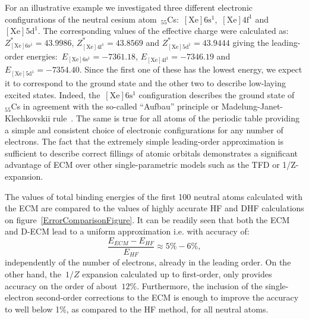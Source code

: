 For an illustrative example we investigated three different electronic configurations of the neutral cesium atom~$_{55}$Cs:~$[\mathrm{Xe}]6\mathrm{s}^{1}$,~$[\mathrm{Xe}]4\mathrm{f}^{1}$ and
$[\mathrm{Xe}]5\mathrm{d}^{1}$. The corresponding values of the effective charge were calculated as: $Z^*_{[\mathrm{Xe}]6\mathrm{s}^{1}} = 43.9986$, $Z^*_{[\mathrm{Xe}]4\mathrm{f}^{1}} = 43.8569$ and $Z^*_{[\mathrm{Xe}]5\mathrm{d}^{1}} = 43.9444$ giving the leading-order energies:~$E_{[\mathrm{Xe}]6\mathrm{s}^{1}} = -7361.18$, $E_{[\mathrm{Xe}]4\mathrm{f}^{1}} = -7346.19$ and $E_{[\mathrm{Xe}]5\mathrm{d}^{1}} = -7354.40$. Since the first one of these has the lowest energy, we expect it to correspond to the ground state and the other two to describe low-laying excited states. Indeed, the~$[\mathrm{Xe}]6\mathrm{s}^{1}$ configuration describes the ground state of~$_{55}$Cs in agreement with the so-called ``Aufbau'' principle or Madelung-Janet-Klechkovskii rule~\cite{Madelung1936,KlechkovskiiA1962justification, doi:10.1021/ed056p714}. The same is true for all atoms of the periodic table providing a simple and consistent choice of electronic configurations for any number of electrons. The fact that the extremely simple leading-order approximation is sufficient to describe correct fillings of atomic orbitals demonstrates a significant advantage of ECM over other single-parametric models such as the TFD or 1/Z-expansion.%

The values of total binding energies of the first 100 neutral atoms calculated with the ECM are compared to the values of highly accurate HF and DHF calculations on figure~\ref{ErrorComparisonFigure}. It can be readily seen that both the ECM and D-ECM lead to a uniform approximation i.e. with accuracy of:
\begin{equation} \label{Errorformula}
    \frac{E_{ECM}-E_{HF}}{E_{HF}} \approx 5\% - 6\%,
\end{equation}
independently of the number of electrons, already in the leading order. On the other hand, the~$1/Z$ expansion calculated up to first-order, only provides accuracy on the order of about~$12\%$. Furthermore, the inclusion of the single-electron second-order corrections to the ECM is enough to improve the accuracy to well below 1\%, as compared to the HF method, for all neutral atoms.

